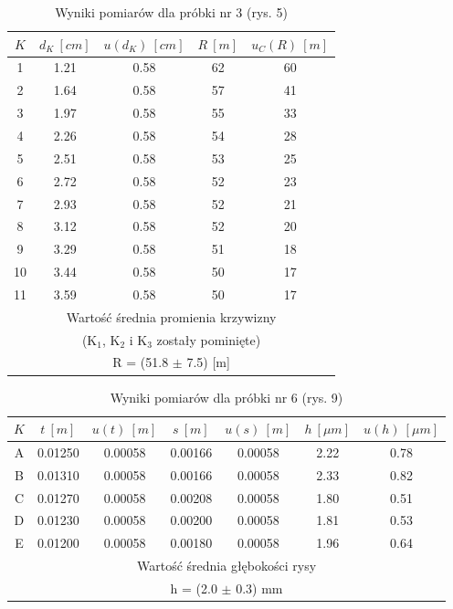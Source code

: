 \documentclass[12pt, a4paper, oneside]{article}
\begin{document}
\begin{table}[b]
  \centering
  \caption{Wyniki pomiarów dla próbki nr 3 (rys. 5)}
    \begin{tabular}{|c|c|c|c|c|}\hline
    $K$ & $d_K~[cm]$ & $u(d_K)~[cm]$ & $R~[m]$ & $u_C(R) ~[m]$ \\\hline
    1 & 1.21 & 0.58 & 62 & 60 \\\hline
    2 & 1.64 & 0.58 & 57 & 41 \\\hline
    3 & 1.97 & 0.58 & 55 & 33 \\\hline
    4 & 2.26 & 0.58 & 54 & 28 \\\hline
    5 & 2.51 & 0.58 & 53 & 25 \\\hline
    6 & 2.72 & 0.58 & 52 & 23 \\\hline
    7 & 2.93 & 0.58 & 52 & 21 \\\hline
    8 & 3.12 & 0.58 & 52 & 20 \\\hline
    9 & 3.29 & 0.58 & 51 & 18 \\\hline
    10 & 3.44 & 0.58 & 50 & 17 \\\hline
    11 & 3.59 & 0.58 & 50 & 17 \\\hline
    \multicolumn{5}{|c|}{Wartość średnia promienia krzywizny} \\
    \multicolumn{5}{|c|}{(K$_1$, K$_2$ i K$_3$ zostały pominięte)} \\\hline
    \multicolumn{5}{|c|}{R = (51.8 $\pm$ 7.5) [m]} \\\hline
    \end{tabular}%
  \label{tab:addlabel}%
\end{table}%
\clearpage
\begin{table}[t]
  \centering
  \caption{Wyniki pomiarów dla próbki nr 6 (rys. 9)}
    \begin{tabular}{|c|c|c|c|c|c|c|}\hline
    $K$ & $t~[m]$ & $u(t)~[m]$ & $s~[m]$ & $u(s)~[m]$ & $h~[\mu m]$ & $u(h)~[\mu m]$ \\\hline
    A & 0.01250 & 0.00058 & 0.00166 & 0.00058 & 2.22 & 0.78 \\\hline
    B & 0.01310 & 0.00058 & 0.00166 & 0.00058 & 2.33 & 0.82 \\\hline
    C & 0.01270 & 0.00058 & 0.00208 & 0.00058 & 1.80 & 0.51 \\\hline
    D & 0.01230 & 0.00058 & 0.00200 & 0.00058 & 1.81 & 0.53 \\\hline
    E & 0.01200 & 0.00058 & 0.00180 & 0.00058 & 1.96 & 0.64 \\\hline
    \multicolumn{7}{|c|}{Wartość średnia głębokości rysy} \\\hline
    \multicolumn{7}{|c|}{h = (2.0 $\pm$ 0.3) mm} \\\hline
    \end{tabular}%
  \label{tab:addlabel}%
\end{table}%
\end{document}
